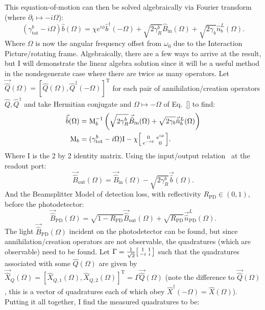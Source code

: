 This equation-of-motion can then be solved algebraically via Fourier transform (where $\partial_t \mapsto -i \Omega$): $$(\gamma^b_\mathrm{tot}-i \Omega)\hat b(\Omega)=\chi e^{i\phi}\hat b^\dag(-\Omega)  + \sqrt{2\gamma^b_R}\hat{B}_\mathrm{in}(\Omega) + \sqrt{2\gamma_b}\hat{n}^L_b(\Omega).$$ Where $\Omega$ is now the angular frequency offset from $\omega_0$ due to the Interaction Picture/rotating frame. Algebraically, there are a few ways to arrive at the result, but I will demonstrate the linear algebra solution since it will be a useful method in the nondegenerate case where there are twice as many operators. Let $\vec{\hat{Q}}(\Omega)=[\hat{Q}(\Omega),\hat{Q}^\dag(-\Omega)]^\text{T}$ for each pair of annihilation/creation operators $\hat Q, \hat Q^\dag$ and take Hermitian conjugate and $\Omega\mapsto -\Omega$ of Eq.~\ref{} to find: 
\begin{align}\vec{\hat b}(\Omega)&=\text{M}_b^{-1}\left(\sqrt{2\gamma^b_R}\vec{\hat{B}}_\mathrm{in}(\Omega) + \sqrt{2\gamma_b}\vec{\hat{n}}^L_b(\Omega)\right)\\
\text{M}_b&=(\gamma^b_\mathrm{tot}-i \Omega)\text{I}-\chi \begin{bsmallmatrix}0 & e^{i\phi} \\e^{-i\phi} & 0\end{bsmallmatrix}.
\end{align}
Where $\text{I}$ is the 2 by 2 identity matrix. Using the input/output relation~\cite{} at the readout port: $$\label{eq:dOPO_IO_readout}\vec{\hat{B}}_\mathrm{out}(\Omega)=\vec{\hat{B}}_\mathrm{in}(\Omega)-\sqrt{2\gamma^b_R}\vec{\hat b}(\Omega).$$ And the Beamsplitter Model of detection loss, with reflectivity $R_\text{PD}\in(0,1)$, before the photodetector: $$\label{eq:dOPO_IO_PD}\vec{\hat{B}}_\mathrm{PD}(\Omega)=\sqrt{1-R_\text{PD}}\vec{\hat{B}}_\mathrm{out}(\Omega)+\sqrt{R_\text{PD}}\vec{\hat n}^L_\text{PD}(\Omega).$$ The light $\vec{\hat{B}}_\mathrm{PD}(\Omega)$ incident on the photodetector can be found, but since annihilation/creation operators are not observable, the quadratures (which are observable) need to be found. Let $\Gamma = \frac{1}{\sqrt2} \begin{bsmallmatrix}1 & 1 \\-i & i\end{bsmallmatrix}$ such that the quadratures associated with some $\hat{Q}(\Omega)$ are given by $\vec{\hat{X}}_Q(\Omega)=[\hat{X}_{Q,1}(\Omega),\hat{X}_{Q,2}(\Omega)]^\text{T}=\Gamma \vec{\hat{Q}}(\Omega)$ (note the difference to $\vec{\hat{Q}}(\Omega)$, this is a vector of quadratures each of which obey $\hat{X}^\dag(-\Omega)=\hat{X}(\Omega)$). Putting it all together, I find the measured quadratures to be: 
